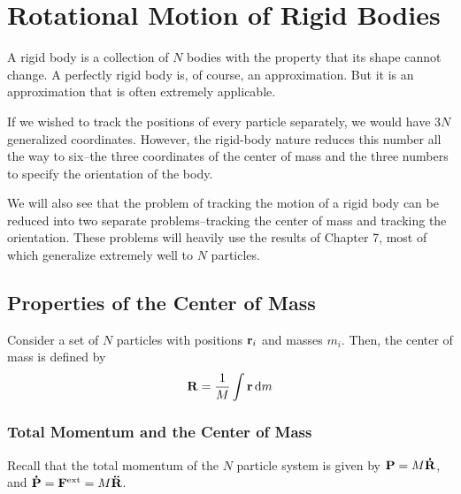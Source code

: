 \chapter{Rotational Motion of Rigid Bodies}
A rigid body is a collection of $N$ bodies with the property that its shape cannot change. A perfectly rigid body is, of course, an approximation. But it is an approximation that is often extremely applicable. 

If we wished to track the positions of every particle separately, we would have $3N$ generalized coordinates. However, the rigid-body nature reduces this number all the way to six--the three coordinates of the center of mass and the three numbers to specify the orientation of the body.

We will also see that the problem of tracking the motion of a rigid body can be reduced into two separate problems--tracking the center of mass and tracking the orientation. These problems will heavily use the results of Chapter 7, most of which generalize extremely well to $N$ particles.
\section{Properties of the Center of Mass}
Consider a set of $N$ particles with positions $\mathbf{r}_i$ and masses $m_i$. Then, the center of mass is defined by
\[ \mathbf{R} = \frac{1}{M}\int \mathbf{r} \, \dd m\]
\subsection*{Total Momentum and the Center of Mass}
Recall that the total momentum of the $N$ particle system is given by $\mathbf{P} = M\mathbf{\dot R}$, and $\mathbf{\dot P} = \mathbf{F}^\text{ext} = M\mathbf{\ddot R}$.
